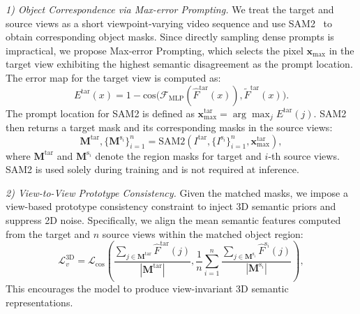 \documentclass[runningheads]{llncs}
\begin{document}
\noindent
\textit{1) Object Correspondence via Max-error Prompting.} 
We treat the target and source views as a short viewpoint-varying video sequence and use SAM2~\cite{sam2} to obtain corresponding object masks. 
Since directly sampling dense prompts is impractical, we propose Max-error Prompting, which selects the pixel $\mathbf{x}_{\text{max}}$ in the target view exhibiting the highest semantic disagreement as the prompt location. The error map for the target view is computed as: 
\begin{equation}
{E}^{\text{tar}}(x) = 1 - \text{cos} \big( \mathcal{F}_{\text{MLP}}(\hat{F}^{\text{tar}}(x)), \tilde{F}^{\text{tar}}(x) \big). 
\end{equation}  
The prompt location for SAM2 is defined as $\mathbf{x}_{\text{max}}^{\text{tar}} = \arg\max_j {E}^{\text{tar}}(j)$. 
SAM2 then returns a target mask and its corresponding masks in the source views:
\begin{equation}
\mathbf{M}^{\text{tar}}, \{\mathbf{M}^{\text{s}_i}\}_{i=1}^{n} = \text{SAM2} (I^{\text{tar}}, \{I^{\text{s}_i}\}_{i=1}^{n}, \mathbf{x}_{\text{max}}^{\text{tar}}), 
\label{eq:sam2_prompt}
\end{equation}
where $\mathbf{M}^{\text{tar}}$ and $\mathbf{M}^{\text{s}_i}$ denote the region masks for target and $i$-th source views.
SAM2 is used solely during training and is not required at inference. 


\noindent
\textit{2) View-to-View Prototype Consistency.}  
Given the matched masks, we impose a view-based prototype consistency constraint to inject 3D semantic priors and suppress 2D noise. 
Specifically, we align the mean semantic features computed from the target and $n$ source views within the matched object region: 
\begin{equation}
\mathcal{L}^{\text{3D}}_v =  \mathcal{L}_{\cos} \left( \frac{\sum_{j \in \mathbf{M}^{\text{tar}}} \hat{F}^{\text{tar}}(j)}{|\mathbf{M}^{\text{tar}}|}, \frac{1}{n} \sum_{i=1}^{n}\frac{\sum_{j \in \mathbf{M}^{\text{s}_i}} \hat{F}^{\text{s}_i}(j)}{|\mathbf{M}^{\text{s}_i}|} \right), 
\label{eq:cross_view_cons}
\end{equation} 
This encourages the model to produce view-invariant 3D semantic representations. 
\end{document}
